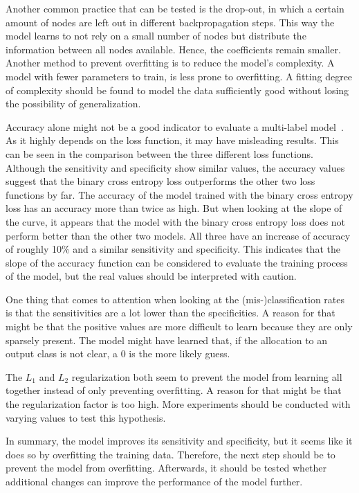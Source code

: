 Another common practice that can be tested is the drop-out, in which a certain amount of nodes are left out in different backpropagation steps. This way the model learns to not rely on a small number of nodes but distribute the information between all nodes available. Hence, the coefficients remain smaller. Another method to prevent overfitting is to reduce the model's complexity. A model with fewer parameters to train, is less prone to overfitting. A fitting degree of complexity should be found to model the data sufficiently good without losing the possibility of generalization.

Accuracy alone might not be a good indicator to evaluate a multi-label model~\citep{gibaja2015}. As it highly depends on the loss function, it may have misleading results. This can be seen in the comparison between the three different loss functions. Although the sensitivity and specificity show similar values, the accuracy values suggest that the binary cross entropy loss outperforms the other two loss functions by far. The accuracy of the model trained with the binary cross entropy loss has an accuracy more than twice as high. But when looking at the slope of the curve, it appears that the model with the binary cross entropy loss does not perform better than the other two models. All three have an increase of accuracy of roughly 10\% and a similar sensitivity and specificity. This indicates that the slope of the accuracy function can be considered to evaluate the training process of the model, but the real values should be interpreted with caution.

One thing that comes to attention when looking at the (mis-)classification rates is that the sensitivities are a lot lower than the specificities. A reason for that might be that the positive values are more difficult to learn because they are only sparsely present. The model might have learned that, if the allocation to an output class is not clear, a 0 is the more likely guess.

The \(L_1\) and \(L_2\) regularization both seem to prevent the model from learning all together instead of only preventing overfitting. A reason for that might be that the regularization factor is too high. More experiments should be conducted with varying values to test this hypothesis.

\bigskip
In summary, the model improves its sensitivity and specificity, but it seems like it does so by overfitting the training data. Therefore, the next step should be to prevent the model from overfitting. Afterwards, it should be tested whether additional changes can improve the performance of the model further.


